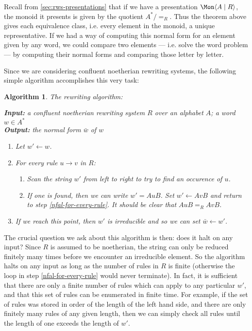 \documentclass[noindex,noinsetproof,emphthm,12pt]{lmaths}
\newtheorem{algorithm}[defn]{Algorithm}
\begin{document}
Recall from \cref{sec:rws-presentations} that if we have a presentation $\Mon \langle A \mid R \rangle$, the monoid it presents is given by the quotient $A^*/{=_R}$. Thus the theorem above gives each equivalence class, i.e. every element in the monoid, a unique representative. If we had a way of computing this normal form for an element given by any word, we could compare two elements --- i.e. solve the word problem --- by computing their normal forms and comparing those letter by letter.

Since we are considering confluent noetherian rewriting systems, the following simple algorithm accomplishes this very task:

\begin{algorithm} The rewriting algorithm: \label{alg:rewrite}

\hspace{0.05\textwidth}
\parbox[t]{0.9\textwidth}{
	\textbf{Input:} a confluent noetherian rewriting system $R$ over an alphabet $A$; a word $w \in A^*$ \\
	\textbf{Output:} the normal form $\bar w$ of $w$
	\medskip

	\begin{enumerate}
		\item Let $w' \leftarrow w$.
		\item For every rule $u \to v$ in $R$:	\label{nfal-for-every-rule}
			\begin{enumerate}
				\item Scan the string $w'$ from left to right to try to find an occurence of $u$.
				\item If one is found, then we can write $w' = AuB$. Set $w' \leftarrow AvB$ and return to step \ref{nfal-for-every-rule}. It should be clear that $AuB =_R AvB$.
			\end{enumerate}
		\item If we reach this point, then $w'$ is irreducible and so we can set $\bar w \leftarrow w'$.
	\end{enumerate}
}
\end{algorithm}

The crucial question we ask about this algorithm is then: does it halt on any input? Since $R$ is assumed to be noetherian, the string can only be reduced finitely many times before we encounter an irreducible element. So the algorithm halts on any input as long as the number of rules in $R$ is finite (otherwise the loop in step \ref{nfal-for-every-rule} would never terminate). In fact, it is sufficient that there are only a finite number of rules which can apply to any particular $w'$, and that this set of rules can be enumerated in finite time. For example, if the set of rules was stored in order of the length of the left hand side, and there are only finitely many rules of any given length, then we can simply check all rules until the length of one exceeds the length of $w'$.
\end{document}
